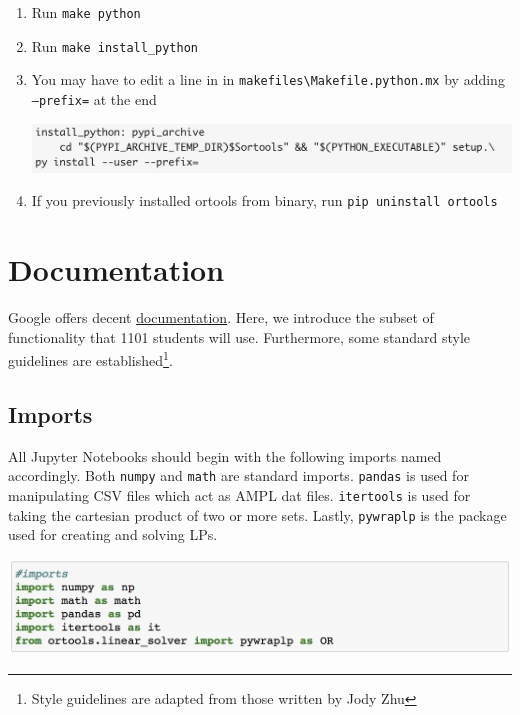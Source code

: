 \documentclass[11 pt]{article}
\newcommand{\code}[1]{\colorbox{gray!10}{\textcolor{black!85}{\texttt{#1}}}}
\begin{document}
\begin{enumerate}
\begin{center}
\end{center}
\item Run \code{make python}
\item Run \code{make install\_python}
\item You may have to edit a line in in \texttt{makefiles\textbackslash Makefile.python.mx} by adding \texttt{--prefix=} at the end 
\begin{center}
\includegraphics[scale=0.7]{MakefileLastStep.png}
\end{center}
\item If you previously installed ortools from binary, run \code{pip uninstall ortools}
\end{enumerate} 

\section{Documentation}

Google offers decent \href{https://developers.google.com/optimization/reference/python/linear_solver/pywraplp}{documentation}. Here, we introduce the subset of functionality that 1101 students will use. Furthermore, some standard style guidelines are established\footnote{Style guidelines are adapted from those written by Jody Zhu}.

\subsection{Imports}

All Jupyter Notebooks should begin with the following imports named accordingly. Both \texttt{numpy} and \texttt{math} are standard imports. \texttt{pandas} is used for manipulating CSV files which act as AMPL dat files. \texttt{itertools} is used for taking the cartesian product of two or more sets. Lastly, \texttt{pywraplp} is the package used for creating and solving LPs.
\begin{center}
\includegraphics[scale=0.7]{imports.png}
\end{center}
\end{document}
